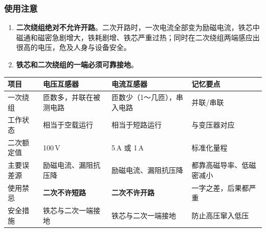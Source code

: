 \subsubsection{使用注意}
\begin{enumerate}
  \item \textbf{二次绕组绝对不允许开路}。二次开路时，一次电流全部变为励磁电流，铁芯中磁通和磁密急剧增大，铁耗剧增、铁芯严重过热；同时在二次绕组两端感应出很高的电压，危及人身与设备安全。
  \item \textbf{铁芯和二次绕组的一端必须可靠接地}。
\end{enumerate}

\begin{center}
\begin{tabular}{@{}p{2.3cm}p{3.3cm}p{3.6cm}p{4.0cm}@{}}
\toprule
项目 & 电压互感器 & 电流互感器 & 记忆要点 \\
\midrule
一次绕组 & 匝数多，并联在被测电路 & 匝数少（1～几匝），串入电路 & 并联/串联 \\
工作状态 & 相当于空载运行 & 相当于短路运行 & 与变压器对应 \\
二次额定值 & 100\,V & 5\,A 或 1\,A & 标准化量程 \\
主要误差源 & 励磁电流、漏阻抗压降 & 励磁电流、漏阻抗压降 & 都靠高磁导率、低磁密减小 \\
使用禁忌 & \textbf{二次不许短路} & \textbf{二次不许开路} & 一字之差，后果都严重 \\
安全措施 & 铁芯与二次一端接地 & 铁芯与二次一端接地 & 防止高压窜入低压 \\
\bottomrule
\end{tabular}
\end{center}

